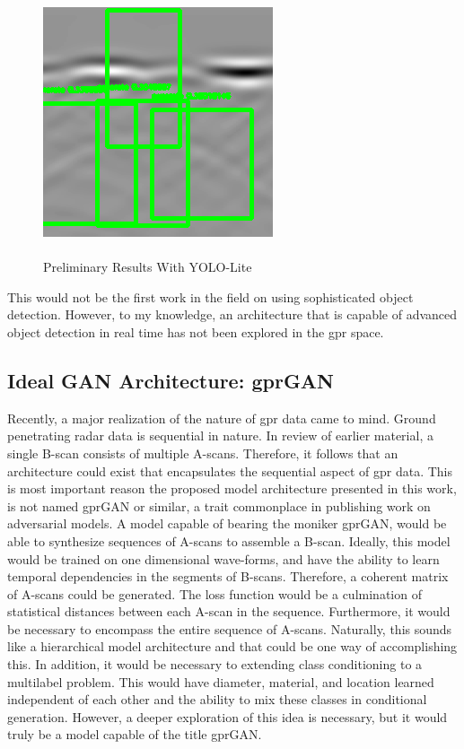 \begin{figure}[H]
    \centering
    \includegraphics[width=0.6\linewidth]{figures/gpr_yolo.png}
    \vspace{\baselineskip}
    \caption{\\Preliminary Results With YOLO-Lite}
    \label{fig:yolo-lite}
\end{figure}

\hspace{0.5in}This would not be the first work in the field on using sophisticated object detection. However, to my knowledge, an architecture that is capable of advanced object detection in real time has not been explored in the \acrshort{gpr} space.

\subsection{Ideal GAN Architecture: gprGAN}
\hspace{0.5in}Recently, a major realization of the nature of \acrshort{gpr} data came to mind. Ground penetrating radar data is sequential in nature. In review of earlier material, a single B-scan consists of multiple A-scans. Therefore, it follows that an architecture could exist that encapsulates the sequential aspect of \acrshort{gpr} data. This is most important reason the proposed model architecture presented in this work, is not named gprGAN or similar, a trait commonplace in publishing work on adversarial models. A model capable of bearing the moniker gprGAN, would be able to synthesize sequences of A-scans to assemble a B-scan. Ideally, this model would be trained on one dimensional wave-forms, and have the ability to learn temporal dependencies in the segments of B-scans. Therefore, a coherent matrix of A-scans could be generated. The loss function would be a culmination of statistical distances between each A-scan in the sequence. Furthermore, it would be necessary to encompass the entire sequence of A-scans. Naturally, this sounds like a hierarchical model architecture and that could be one way of accomplishing this. In addition, it would be necessary to extending class conditioning to a multilabel problem. This would have diameter, material, and location learned independent of each other and the ability to mix these classes in conditional generation. However, a deeper exploration of this idea is necessary, but it would truly be a model capable of the title gprGAN. 